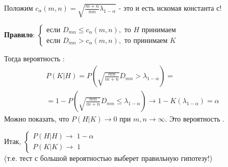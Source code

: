 \begin{example}
	Положим $\displaystyle c_{\alpha}(m,n) =\sqrt{\frac{m+n}{mn}\lambda_{1-\alpha}}$ - это и есть искомая константа с!

	\textbf{Правило}:
	$\displaystyle \begin{cases}
		\text{если } D_{mn}\leq c_{\alpha}(m,n), \text{ то } H \text{ принимаем }\\
		\text{если } D_{mn}> c_{\alpha}(m,n), \text{ то принимаем } K
	\end{cases}$

	Тогда вероятность :
	\begin{gather*}
		P(K|H) = P(\sqrt{\frac{mn}{m+n}}D_{mn} > \lambda_{1-\alpha}) =\\
		=1 - P(\sqrt{\frac{mn}{m+n}}D_{mn}\leq \lambda_{1-\alpha}) \rightarrow 1 - K(\lambda_{1-\alpha}) = \alpha
	\end{gather*}
	Можно показать, что $P(H|K) \to 0$ при $m,n \to \infty$. Это вероятность .

	Итак, $\displaystyle \begin{cases}
			P(H|H) \rightarrow \; 1-\alpha\\
			P(K|K) \rightarrow \; 1
		\end{cases}$\\
	(т.е. тест с большой вероятностью выберет правильную гипотезу!)
\end{example}
